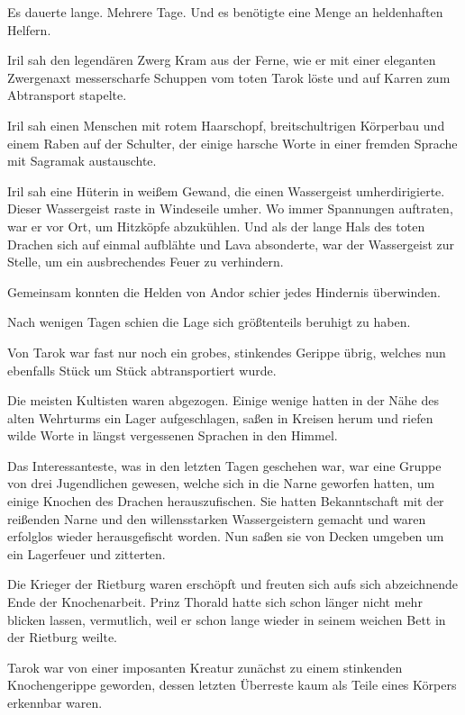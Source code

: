 Es dauerte lange. Mehrere Tage. Und es benötigte eine Menge an heldenhaften Helfern.

Iril sah den legendären Zwerg Kram aus der Ferne, wie er mit einer eleganten Zwergenaxt messerscharfe Schuppen vom toten Tarok löste und auf Karren zum Abtransport stapelte.

Iril sah einen Menschen mit rotem Haarschopf, breitschultrigen Körperbau und einem Raben auf der Schulter, der einige harsche Worte in einer fremden Sprache mit Sagramak austauschte.

Iril sah eine Hüterin in weißem Gewand, die einen Wassergeist umherdirigierte. Dieser Wassergeist raste in Windeseile umher. Wo immer Spannungen auftraten, war er vor Ort, um Hitzköpfe abzukühlen. Und als der lange Hals des toten Drachen sich auf einmal aufblähte und Lava absonderte, war der Wassergeist zur Stelle, um ein ausbrechendes Feuer zu verhindern.

Gemeinsam konnten die Helden von Andor schier jedes Hindernis überwinden.\bigskip







Nach wenigen Tagen schien die Lage sich größtenteils beruhigt zu haben.

Von Tarok war fast nur noch ein grobes, stinkendes Gerippe übrig, welches nun ebenfalls Stück um Stück abtransportiert wurde.

Die meisten Kultisten waren abgezogen. Einige wenige hatten in der Nähe des alten Wehrturms ein Lager aufgeschlagen, saßen in Kreisen herum und riefen wilde Worte in längst vergessenen Sprachen in den Himmel.

Das Interessanteste, was in den letzten Tagen geschehen war, war eine Gruppe von drei Jugendlichen gewesen, welche sich in die Narne geworfen hatten, um einige Knochen des Drachen herauszufischen. Sie hatten Bekanntschaft mit der reißenden Narne und den willensstarken Wassergeistern gemacht und waren erfolglos wieder herausgefischt worden. Nun saßen sie von Decken umgeben um ein Lagerfeuer und zitterten.

Die Krieger der Rietburg waren erschöpft und freuten sich aufs sich abzeichnende Ende der Knochenarbeit. Prinz Thorald hatte sich schon länger nicht mehr blicken lassen, vermutlich, weil er schon lange wieder in seinem weichen Bett in der Rietburg weilte.

Tarok war von einer imposanten Kreatur zunächst zu einem stinkenden Knochengerippe geworden, dessen letzten Überreste kaum als Teile eines Körpers erkennbar waren.

